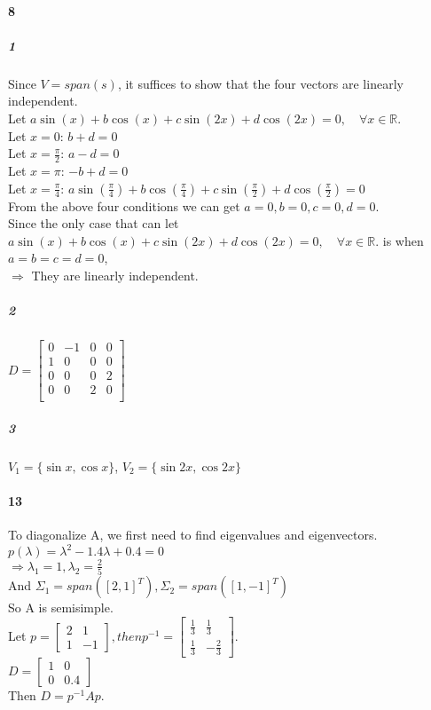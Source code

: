 \documentclass[10pt,letter]{article}
\begin{document}
\paragraph{8}
\subparagraph{1} Since $V=span(s)$, it suffices to show that the four vectors are linearly independent. \\
Let $a \sin(x)+b\cos(x)+c\sin(2x)+d\cos(2x)=0,\quad \forall x\in \mathbb{R}.$\\
Let $x=0$: $b+d=0$\\
Let $x=\frac{\pi}{2}$: $a-d=0$\\
Let $x=\pi$: $-b+d=0$\\
Let $x=\frac{\pi}{4}$: $a \sin(\frac{\pi}{4})+b\cos(\frac{\pi}{4})+c\sin(\frac{\pi}{2})+d\cos(\frac{\pi}{2})=0$\\
From the above four conditions we can get $a=0, b=0, c=0, d=0$. \\
Since the only case that can let $a \sin(x)+b\cos(x)+c\sin(2x)+d\cos(2x)=0,\quad \forall x\in \mathbb{R}.$ is when $a=b=c=d=0$,\\
$\Rightarrow$ They are linearly independent. 
\subparagraph{2} 
$D=\begin{bmatrix}
0&-1&0&0\\
1&0&0&0\\
0&0&0&2\\
0&0&2&0\\
\end{bmatrix}$
\subparagraph{3} 
$V_1=\{\sin x,\cos x\}$, $V_2=\{\sin 2x,\cos 2x\}$
\paragraph{13}
To diagonalize A, we first need to find eigenvalues and eigenvectors. \\
$p(\lambda)=\lambda^2-1.4\lambda+0.4=0$\\
$\Rightarrow \lambda_1=1, \lambda_2 = \frac{2}{5}$\\
And $\Sigma_1=span([2,1]^T), \Sigma_2=span([1,-1]^T)$\\
So A is semisimple.\\
Let $p=\begin{bmatrix}
2&1\\1&-1
\end{bmatrix}, then p^{-1}=\begin{bmatrix}
\frac{1}{3}&\frac{1}{3}\\\frac{1}{3}&-\frac{2}{3}
\end{bmatrix}$.\\
$D=\begin{bmatrix}
1&0\\0&0.4
\end{bmatrix}$\\
Then $D=p^{-1}Ap$.\\
\end{document}
